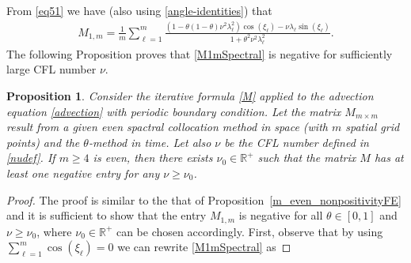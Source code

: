 \documentclass[a4paper]{article}
\newtheorem{proposition}{Proposition}
\newcommand{\rr}{\mathbb{R}}
\begin{document}
\begin{description}[style=unboxed,leftmargin=0cm]
\item [{Case 1:} $m$ is {even}.]
From \eqref{eq51} we have (also using \eqref{angle-identities}) that
\begin{align}\label{M1mSpectral}
	M_{1,m} = \frac{1}{m} \sum_{\ell=1}^{m} \frac{\left(1-\theta(1-\theta)\nu^2\lambda_\ell^2\right)
	\cos(\xi_\ell) - \nu\lambda_\ell\sin(\xi_\ell)}{1+\theta^2\nu^2\lambda_\ell^2}.
\end{align}
The following Proposition proves that \eqref{M1mSpectral} is negative for sufficiently large CFL number $\nu$.
\begin{proposition}\label{m_even_nonpositivitySpectral}
	Consider the iterative formula \eqref{M} applied to the advection equation \eqref{advection} with periodic
	boundary condition.
	Let the matrix $M_{m \times m}$ result from a given even spactral collocation method in space (with $m$
	spatial grid points) and the $\theta$-method in time.
	Let also $\nu$ be the CFL number defined in \eqref{nudef}.
	If $m \ge 4$ is \emph{even}, then there exists $\nu_0  \in \rr^+$ such that the matrix $M$ has at least one
	negative entry for any $\nu \ge \nu_0$.
\end{proposition}
\begin{proof}
	The proof is similar to the that of Proposition~\ref{m_even_nonpositivityFE} and it is sufficient to show that
	the entry $M_{1,m}$ is negative for all $\theta \in [0,1]$ and $\nu \ge \nu_0$, where $\nu_0 \in \rr^+$ can
	be chosen accordingly.
	First, observe that by using $\sum_{\ell=1}^m \cos(\xi_\ell) = 0$ we can rewrite \eqref{M1mSpectral} as

\end{proof}
\end{description}
\end{document}
